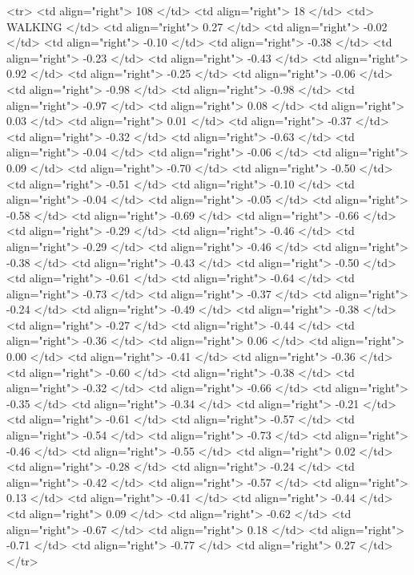   <tr> <td align="right"> 108 </td> <td align="right">  18 </td> <td> WALKING </td> <td align="right"> 0.27 </td> <td align="right"> -0.02 </td> <td align="right"> -0.10 </td> <td align="right"> -0.38 </td> <td align="right"> -0.23 </td> <td align="right"> -0.43 </td> <td align="right"> 0.92 </td> <td align="right"> -0.25 </td> <td align="right"> -0.06 </td> <td align="right"> -0.98 </td> <td align="right"> -0.98 </td> <td align="right"> -0.97 </td> <td align="right"> 0.08 </td> <td align="right"> 0.03 </td> <td align="right"> 0.01 </td> <td align="right"> -0.37 </td> <td align="right"> -0.32 </td> <td align="right"> -0.63 </td> <td align="right"> -0.04 </td> <td align="right"> -0.06 </td> <td align="right"> 0.09 </td> <td align="right"> -0.70 </td> <td align="right"> -0.50 </td> <td align="right"> -0.51 </td> <td align="right"> -0.10 </td> <td align="right"> -0.04 </td> <td align="right"> -0.05 </td> <td align="right"> -0.58 </td> <td align="right"> -0.69 </td> <td align="right"> -0.66 </td> <td align="right"> -0.29 </td> <td align="right"> -0.46 </td> <td align="right"> -0.29 </td> <td align="right"> -0.46 </td> <td align="right"> -0.38 </td> <td align="right"> -0.43 </td> <td align="right"> -0.50 </td> <td align="right"> -0.61 </td> <td align="right"> -0.64 </td> <td align="right"> -0.73 </td> <td align="right"> -0.37 </td> <td align="right"> -0.24 </td> <td align="right"> -0.49 </td> <td align="right"> -0.38 </td> <td align="right"> -0.27 </td> <td align="right"> -0.44 </td> <td align="right"> -0.36 </td> <td align="right"> 0.06 </td> <td align="right"> 0.00 </td> <td align="right"> -0.41 </td> <td align="right"> -0.36 </td> <td align="right"> -0.60 </td> <td align="right"> -0.38 </td> <td align="right"> -0.32 </td> <td align="right"> -0.66 </td> <td align="right"> -0.35 </td> <td align="right"> -0.34 </td> <td align="right"> -0.21 </td> <td align="right"> -0.61 </td> <td align="right"> -0.57 </td> <td align="right"> -0.54 </td> <td align="right"> -0.73 </td> <td align="right"> -0.46 </td> <td align="right"> -0.55 </td> <td align="right"> 0.02 </td> <td align="right"> -0.28 </td> <td align="right"> -0.24 </td> <td align="right"> -0.42 </td> <td align="right"> -0.57 </td> <td align="right"> 0.13 </td> <td align="right"> -0.41 </td> <td align="right"> -0.44 </td> <td align="right"> 0.09 </td> <td align="right"> -0.62 </td> <td align="right"> -0.67 </td> <td align="right"> 0.18 </td> <td align="right"> -0.71 </td> <td align="right"> -0.77 </td> <td align="right"> 0.27 </td> </tr>

